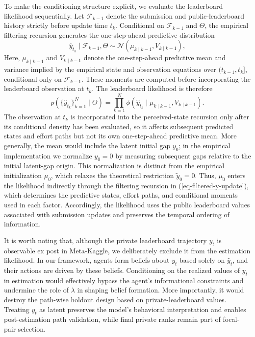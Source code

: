 \documentclass[mnsc]{informs3}
\begin{document}
To make the conditioning structure explicit, we evaluate the leaderboard likelihood sequentially. Let $\mathcal F_{k-1}$ denote the submission and public-leaderboard history strictly before update time $t_k$. Conditional on $\mathcal F_{k-1}$ and $\Theta$, the empirical filtering recursion generates the one-step-ahead predictive distribution
\[
\hat y_{t_k}\mid\mathcal F_{k-1},\Theta
\sim
\mathcal N\!\left(\mu_{k\mid k-1},V_{k\mid k-1}\right),
\]
Here, $\mu_{k\mid k-1}$ and $V_{k\mid k-1}$ denote the one-step-ahead predictive mean and variance implied by the empirical state and observation equations over $(t_{k-1},t_k]$, conditional only on $\mathcal F_{k-1}$. These moments are computed before incorporating the leaderboard observation at $t_k$.
The leaderboard likelihood is therefore
\begin{equation}\label{eq-obs_gap-prob}
p\left(\{\hat{y}_{t_k}\}_{k=1}^N\mid\Theta\right)
=
\prod_{k=1}^N
\phi\left(\hat y_{t_k}\mid\mu_{k\mid k-1},V_{k\mid k-1}\right).
\end{equation}
The observation at $t_k$ is incorporated into the perceived-state recursion only after its conditional density has been evaluated, so it affects subsequent predicted states and effort paths but not its own one-step-ahead predictive mean.
More generally, the mean would include the latent initial gap $y_0$; in the empirical implementation we normalize $y_0=0$ by measuring subsequent gaps relative to the initial latent-gap origin.
This normalization is distinct from the empirical initialization $\mu_0$, which relaxes the theoretical restriction $\tilde y_0=0$.
Thus, $\mu_0$ enters the likelihood indirectly through the filtering recursion in (\ref{eq-filtered-y-update}), which determines the predictive states, effort paths, and conditional moments used in each factor.
Accordingly, the likelihood uses the public leaderboard values associated with submission updates and preserves the temporal ordering of information.

It is worth noting that, although the private leaderboard trajectory $y_t$ is observable ex post in Meta-Kaggle, we deliberately exclude it from the estimation likelihood.
In our framework, agents form beliefs about $y_t$ based solely on $\hat{y}_t$, and their actions are driven by these beliefs.
Conditioning on the realized values of $y_t$ in estimation would effectively bypass the agent’s informational constraints and undermine the role of $\lambda$ in shaping belief formation.
More importantly, it would destroy the path-wise holdout design based on private-leaderboard values.
Treating $y_t$ as latent preserves the model’s behavioral interpretation and enables post-estimation path validation, while final private ranks remain part of focal-pair selection.
\end{document}
